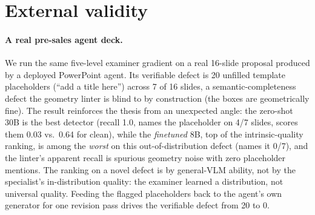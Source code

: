\documentclass[10pt]{article}
\begin{document}
\section{External validity}\label{sec:external}

\paragraph{A real pre-sales agent deck.}
We run the same five-level examiner gradient on a real 16-slide proposal produced by a deployed PowerPoint
agent. Its verifiable defect is 20 unfilled template placeholders (``add a title here'') across 7 of 16
slides, a semantic-completeness defect the geometry linter is blind to by construction (the boxes are
geometrically fine). The result reinforces the thesis from an unexpected angle: the zero-shot 30B is the best
detector (recall 1.0, names the placeholder on 4/7 slides, scores them 0.03 vs.\ 0.64 for clean), while the
\emph{finetuned} 8B, top of the intrinsic-quality ranking, is among the \emph{worst} on this out-of-distribution
defect (names it 0/7), and the linter's apparent recall is spurious geometry noise with zero placeholder
mentions. The ranking on a novel defect is by general-VLM ability, not by the specialist's in-distribution
quality: the examiner learned a distribution, not universal quality. Feeding the flagged placeholders back to
the agent's own generator for one revision pass drives the verifiable defect from 20 to 0.
\end{document}
